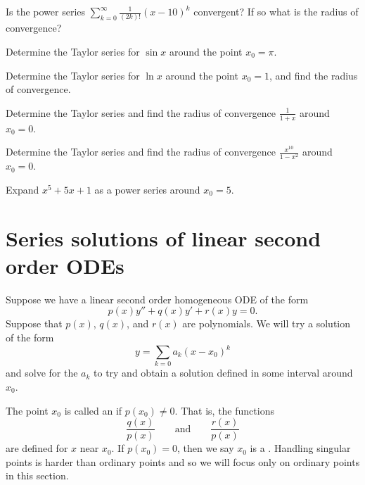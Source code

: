 \documentclass[12pt]{book}
\begin{document}
\begin{exercise}
Is the power series $\displaystyle \sum_{k=0}^\infty \frac{1}{(2k)!} (x-10)^k$
convergent?  If so what is the radius of convergence?
\end{exercise}

\begin{exercise}
Determine the Taylor series for $\sin x$ around the point $x_0 = \pi$.
\end{exercise}

\begin{exercise}
Determine the Taylor series for $\ln x$ around the point $x_0 = 1$,
and find the radius of convergence.
\end{exercise}

\begin{exercise}
Determine the Taylor series
and find the radius of convergence $\frac{1}{1+x}$
around $x_0 = 0$.
\end{exercise}

\begin{exercise}
Determine the Taylor series and find the radius of convergence
$\frac{x^{10}}{1-x^2}$ around $x_0 = 0$.
\end{exercise}

\begin{exercise}
Expand $x^5+5x+1$ as a power series around $x_0 = 5$.
\end{exercise}


\sectionnewpage
\section{Series solutions of linear second order ODEs}


Suppose we have a linear second order homogeneous ODE of the form
\begin{equation}
p(x) y'' + q(x) y' + r(x) y = 0 .
\end{equation}
Suppose that $p(x)$, $q(x)$, and $r(x)$ are polynomials.  We will 
try a solution of the form
\begin{equation}
y = \sum_{k=0} a_k {(x-x_0)}^k
\end{equation}
and solve for the $a_k$ to try and obtain a solution defined in some
interval around $x_0$.

The point $x_0$ is called an \emph{}
if $p(x_0) \not= 0$.  That is, the functions
\begin{equation}
\frac{q(x)}{p(x)} \qquad \text{and} \qquad \frac{r(x)}{p(x)}
\end{equation}
are defined for $x$ near $x_0$.  If $p(x_0) = 0$, then we say $x_0$
is a \emph{}.  Handling singular points is
harder than ordinary points and so we will focus only on ordinary points
in this section.
\end{document}
